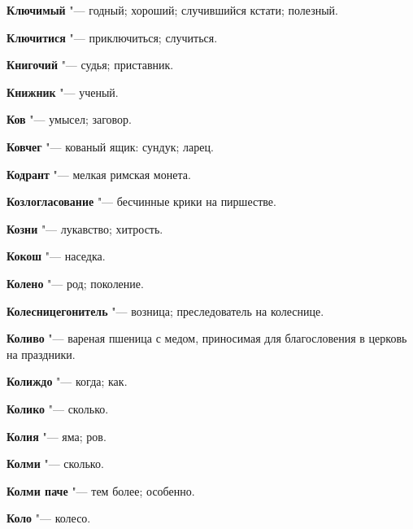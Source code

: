 \begin{mymulticols}{2}
\noindent\textbf{Ключимый} "--- годный; хороший; случившийся кстати; полезный. 




\noindent\textbf{Ключитися} "--- приключиться; случиться. 




\noindent\textbf{Книгочий} "--- судья; приставник. 




\noindent\textbf{Книжник} "--- ученый. 




\noindent\textbf{Ков} "--- умысел; заговор. 




\noindent\textbf{Ковчег} "--- кованый ящик: сундук; ларец. 




\noindent\textbf{Кодрант} "--- мелкая римская монета. 




\noindent\textbf{Козлогласование} "--- бесчинные крики на пиршестве. 




\noindent\textbf{Козни} "--- лукавство; хитрость. 




\noindent\textbf{Кокош} "--- наседка. 




\noindent\textbf{Колено} "--- род; поколение. 




\noindent\textbf{Колесницегонитель} "--- возница; преследователь на колеснице. 




\noindent\textbf{Коливо} "--- вареная пшеница с медом, приносимая для благословения в церковь на праздники. 




\noindent\textbf{Колиждо} "--- когда; как. 




\noindent\textbf{Колико} "--- сколько. 




\noindent\textbf{Колия} "--- яма; ров. 




\noindent\textbf{Колми} "--- сколько. 




\noindent\textbf{Колми паче} "--- тем более; особенно. 




\noindent\textbf{Коло} "--- колесо. 





\end{mymulticols}

